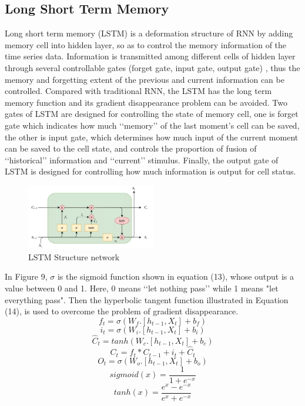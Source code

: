 \documentclass{ieeeojies}
\begin{document}
\subsection{Long Short Term Memory}
Long short term memory (LSTM) \cite{b12} is a deformation structure of RNN by adding memory cell into hidden layer, so as to control the memory information of the time series data. Information is transmitted among different cells of hidden layer through several controllable gates (forget gate, input gate, output gate) \cite{b13}, thus the memory and forgetting extent of the previous and current information can be controlled. Compared with traditional RNN, the LSTM has the long term memory function and its gradient disappearance problem can be avoided. Two gates of LSTM are designed for controlling the state of memory cell, one is forget gate which indicates how much ‘‘memory’’ of the last moment’s cell can be saved, the other is input gate, which determines how much input of the current moment can be saved to the cell state, and controls the proportion of fusion of ‘‘historical’’ information and ‘‘current’’ stimulus. Finally, the output gate of LSTM is designed for controlling how much information is output for cell status.
\begin{figure} [H]
    \centering
    \includegraphics[width=0.5\textwidth]{bibliography/Figure/LSTM _structure.png}
    \caption{LSTM Structure network}
    \label{fig:LSTM structure}
\end{figure}

In Figure 9, $\sigma$ is the sigmoid function shown in equation (13), whose output is a value between 0 and 1. Here, 0 means ‘‘let nothing pass’’ while 1 means "let everything pass". Then the hyperbolic tangent function illustrated in Equation (14), is used to overcome the problem of gradient disappearance.
\begin{equation}
    f_t = \sigma(W_f.[h_{t-1}, X_t] + b_f)
\end{equation}
\begin{equation}
    i_t = \sigma(W_i.[h_{t-1}, X_t] + b_i)
\end{equation}
\begin{equation}
    \hat{C}_t = tanh(W_c.[h_{t-1}, X_t] + b_c)
\end{equation}
\begin{equation}
    C_t = f_t*C_{t-1} + i_t + \hat{C}_t
\end{equation}
\begin{equation}
    O_t = \sigma(W_o.[h_{t-1}, X_t] + b_o)
\end{equation}
\begin{equation}
    sigmoid(x) = \frac{1}{1+e^{-x}}
\end{equation}
\begin{equation}
    tanh(x) = \frac{e^x - e^{-x}}{e^x + e^{-x}}
\end{equation}
\end{document}
